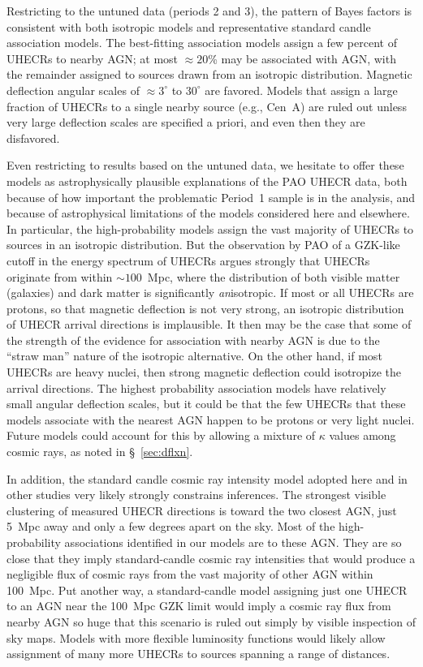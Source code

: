 Restricting to the untuned data (periods 2 and 3), the pattern of Bayes
factors is consistent with both isotropic models and representative standard
candle association models.
The best-fitting association models assign a few percent of UHECRs to nearby
AGN; at most $\approx 20$\% may be associated with AGN, with the remainder
assigned to sources drawn from an isotropic distribution.
Magnetic deflection angular scales of $\approx 3^\circ$
to $30^\circ$ are favored.
Models that assign a large fraction of UHECRs to a single nearby source (e.g.,
Cen~A) are ruled out unless very large deflection scales are specified a
priori, and even then they are disfavored.

Even restricting to results based on the untuned data, we hesitate to offer
these models as astrophysically plausible explanations of the PAO UHECR
data, both because of how important the problematic Period~1 sample is in
the analysis, and because of astrophysical limitations of the models
considered here and elsewhere.  In particular, the high-probability models
assign the vast majority of UHECRs to sources in an isotropic distribution.
But the observation by PAO of a GZK-like cutoff in the energy spectrum of
UHECRs argues strongly that UHECRs originate from within $\sim 100$~Mpc,
where the distribution of both visible matter (galaxies) and dark matter is
significantly {\em an}isotropic.  If most or all UHECRs are protons, so that
magnetic deflection is not very strong, an isotropic distribution of UHECR
arrival directions is implausible.  It then may be the case that some of the
strength of the evidence for association with nearby AGN is due to the
``straw man'' nature of the isotropic alternative.  On the other hand, if
most UHECRs are heavy nuclei, then strong magnetic deflection could
isotropize the arrival directions.  The highest probability association
models have relatively small angular deflection scales, but it could be that
the few UHECRs that these models associate with the nearest AGN happen to be
protons or very light nuclei.  Future models could account for this by
allowing a mixture of $\kappa$ values among cosmic rays, as noted in
\S~\ref{sec:dflxn}.

In addition, the standard candle cosmic ray intensity model adopted here and
in other studies very likely strongly
constrains inferences.  The strongest visible clustering of measured UHECR
directions is toward the two closest AGN, just 5~Mpc away and only a few
degrees apart on the sky.  Most of the high-probability associations
identified in our models are to these AGN.  They are so close that they
imply standard-candle cosmic ray intensities that would produce a negligible
flux of cosmic rays from the vast majority of other AGN within 100~Mpc.  Put
another way, a standard-candle model assigning just one UHECR to an AGN near
the 100~Mpc GZK limit would imply a cosmic ray flux from nearby AGN so huge
that this scenario is ruled out simply by visible inspection of sky maps. 
Models with more flexible luminosity functions would likely allow assignment
of many more UHECRs to sources spanning a range of distances.

